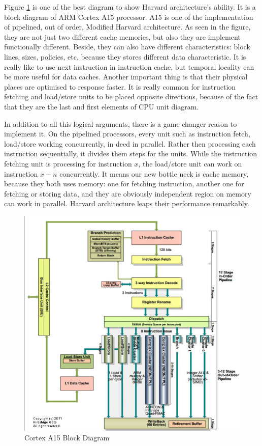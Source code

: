 	Figure \ref{fig:blockdiagram} is one of the best diagram to show Harvard architecture's ability. It is a block diagram of ARM Cortex A15 processor. A15 is one of the implementation of pipelined, out of order, Modified Harvard architecture\cite{sloss2004arm}. As seen in the figure, they are not just two different cache memories, but also they are implement functionally different. Beside, they can also have different characteristics: block lines, sizes, policies, etc\cite{Jim2007}, because they stores different data characteristic. It is really like to use next instruction in instruction cache, but temporal locality can be more useful for data caches. Another important thing is that their physical places are optimised to response faster. It is really common for instruction fetching and load/store units to be placed opposite directions, because of the fact that they are the last and first elements of CPU unit diagram. 

	In addition to all this logical arguments, there is a game changer reason to implement it. On the pipelined processors, every unit such as instruction fetch, load/store working concurrently, in deed in parallel. Rather then processing each instruction sequentially, it divides them steps for the units\cite{ComputerArchCoursera}. While the instruction fetching unit is processing for instruction $x$, the load/store unit can work on instruction $x-n$ concurrently. It means our new bottle neck is cache memory, because they both uses memory: one for fetching instruction, another one for fetching or storing data, and they are obviously independent region on memory can work in parallel. Harvard architecture leaps their performance remarkably. 
	\begin{figure}[h!]
		\centering
		\includegraphics[width=1\textwidth]{img/Cortex_A15_Block_Diagram.jpg}
		\caption{Cortex A15 Block Diagram \cite{sloss2004arm}}
		\label{fig:blockdiagram}
	\end{figure}

